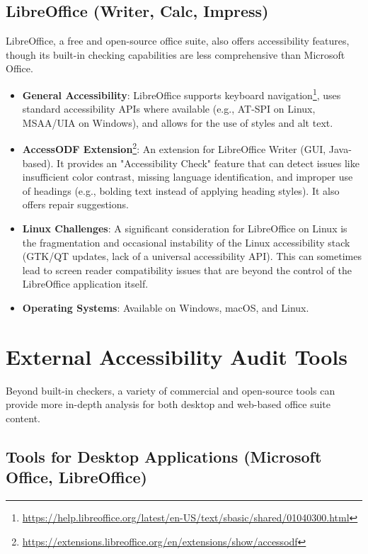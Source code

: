 \subsection{LibreOffice (Writer, Calc, Impress)}
LibreOffice, a free and open-source office suite, also offers accessibility features, though its built-in checking capabilities are less comprehensive than Microsoft Office.
\begin{itemize}
    \item \textbf{General Accessibility}: LibreOffice supports keyboard navigation\footnote{\url{https://help.libreoffice.org/latest/en-US/text/sbasic/shared/01040300.html}}, uses standard accessibility APIs where available (e.g., AT-SPI on Linux, MSAA/UIA on Windows), and allows for the use of styles and alt text.
    \item \textbf{AccessODF Extension}\footnote{\url{https://extensions.libreoffice.org/en/extensions/show/accessodf}}: An extension for LibreOffice Writer (GUI, Java-based). It provides an "Accessibility Check" feature that can detect issues like insufficient color contrast, missing language identification, and improper use of headings (e.g., bolding text instead of applying heading styles). It also offers repair suggestions.
    \item \textbf{Linux Challenges}: A significant consideration for LibreOffice on Linux is the fragmentation and occasional instability of the Linux accessibility stack (GTK/QT updates, lack of a universal accessibility API). This can sometimes lead to screen reader compatibility issues that are beyond the control of the LibreOffice application itself.
    \item \textbf{Operating Systems}: Available on Windows, macOS, and Linux.
\end{itemize}

\section{External Accessibility Audit Tools}

Beyond built-in checkers, a variety of commercial and open-source tools can provide more in-depth analysis for both desktop and web-based office suite content.

\subsection{Tools for Desktop Applications (Microsoft Office, LibreOffice)}

